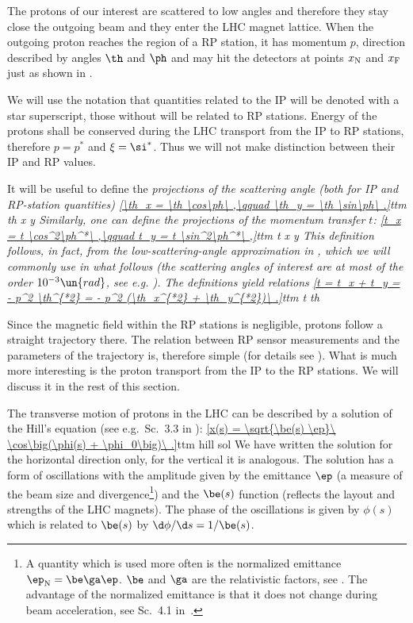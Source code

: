 The protons of our interest are scattered to low angles and therefore they stay close the outgoing beam and they enter the LHC magnet lattice. When the outgoing proton reaches the region of a RP station, it has momentum $p$, direction described by angles $\th$ and $\ph$ and may hit the detectors at points $x_{\rm N}$ and $x_{\rm F}$ just as shown in .

We will use the notation that quantities related to the IP will be denoted with a star superscript, those without will be related to RP stations. Energy of the protons shall be conserved during the LHC transport from the IP to RP stations, therefore $p = p^*$ and $\xi = \si^*$. Thus we will not make distinction between their IP and RP values.

It will be useful to define the \em{projections of the scattering angle} (both for IP and RP-station quantities)
\eqref{\th_x = \th \cos\ph\ ,\qquad \th_y = \th \sin\ph\ .}{ttm th x y}
Similarly, one can define the projections of the momentum transfer $t$:
\eqref{t_x = t \cos^2\ph^*\ ,\qquad t_y = t \sin^2\ph^*\ ,}{ttm t x y}
This definition follows, in fact, from the low-scattering-angle approximation in , which we will commonly use in what follows (the scattering angles of interest are at most of the order $10^{-3}\un{rad}$, see e.g. ). The definitions  yield relations
\eqref{t = t_x + t_y = - p^2 \th^{*2} = - p^2 (\th_x^{*2} + \th_y^{*2})\ .}{ttm t th}

Since the magnetic field within the RP stations is negligible, protons follow a straight trajectory there. The relation between RP sensor measurements and the parameters of the trajectory is, therefore simple (for details see ). What is much more interesting is the proton transport from the IP to the RP stations. We will discuss it in the rest of this section.

The transverse motion of protons in the LHC can be described by a solution of the Hill's equation (see e.g.~Sc.~3.3 in ):
\eqref{x(s) = \sqrt{\be(s) \ep}\ \cos\big(\phi(s) + \phi_0\big)\ .}{ttm hill sol}
We have written the solution for the horizontal direction only, for the vertical it is analogous. The solution has a form of oscillations with the amplitude given by the emittance $\ep$ (a measure of the beam size and divergence\footnote{%
A quantity which is used more often is the normalized emittance $\ep_{\rm N} = \be\ga \ep$. $\be$ and $\ga$ are the relativistic factors, see . The advantage of the normalized emittance is that it does not change during beam acceleration, see Sc.~4.1 in~.
}) and the $\be(s)$ function (reflects the layout and strengths of the LHC magnets). The phase of the oscillations is given by $\phi(s)$ which is related to $\be(s)$ by $\d\phi/\d s = 1/\be(s)$.

